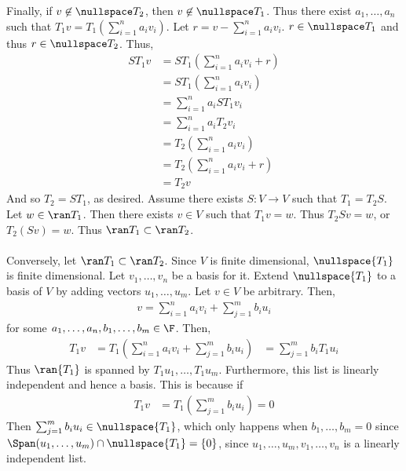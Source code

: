 \documentclass{book}
\begin{document}
\begin{enumerate}[label=\arabic*)]
      Finally, if $v \not\in \nullspace T_2$, then $v \not\in \nullspace T_1$. Thus there exist $a_1, \dots, a_n$ such that $T_1v = T_1(\sum_{i = 1}^{n}a_iv_i)$. Let $r = v -
      \sum_{i = 1}^{n}a_iv_i$. $r \in \nullspace T_1$ and thus $r \in \nullspace T_2$. Thus,
      \begin{align*}
        ST_1v & = ST_1(\sum_{i = 1}^{n}a_iv_i + r) \\
        & = ST_1(\sum_{i = 1}^{n}a_iv_i) \\
        & = \sum_{i = 1}^{n}a_iST_1v_i \\
        & = \sum_{i = 1}^{n}a_iT_2v_i \\
        & = T_2(\sum_{i = 1}^{n}a_iv_i) \\
        & = T_2(\sum_{i = 1}^{n}a_iv_i + r) \\
        & = T_2v
      \end{align*}
      And so $T_2 = ST_1$, as desired.
    \ii
      Assume there exists $S: V \to V$ such that $T_1 = T_2S$. Let $w \in \ran T_1$. Then there exists $v \in V$ such that $T_1v = w$. Thus $T_2Sv = w$, or $T_2(Sv) = w$. Thus $\ran T_1
      \subset \ran T_2$.  
      \\~\\

      Conversely, let $\ran T_1 \subset \ran T_2$. Since $V$ is finite dimensional, $\nullspace{T_1}$ is finite dimensional. Let $v_1, \dots, v_n$ be a basis for it. Extend
      $\nullspace{T_1}$ to a basis of $V$ by adding vectors $u_1, \dots, u_m$. Let $v \in V$ be arbitrary. Then,
      \begin{align*}
        v = \sum_{i = 1}^{n}a_iv_i + \sum_{j = 1}^{m}b_iu_i
      \end{align*}
      for some $a_1, \dots, a_n, b_1, \dots, b_m \in \F$. Then,
      \begin{align*}
        T_1v & = T_1(\sum_{i = 1}^{n}a_iv_i + \sum_{j = 1}^{m}b_iu_i)
        & = \sum_{j = 1}^{m}b_iT_1u_i
      \end{align*}
      Thus $\ran{T_1}$ is spanned by $T_1u_1, \dots, T_1u_m$. Furthermore, this list is linearly independent and hence a basis. This is because if 
      \begin{align*}
        T_1v & = T_1(\sum_{j = 1}^{m}b_iu_i) = 0
      \end{align*}
      Then $\sum_{j = 1}^{m}b_iu_i \in \nullspace{T_1}$, which only happens when $b_1, \dots, b_m = 0$ since $\Span(u_1, \dots, u_m) \cap \nullspace{T_1} = \{0\}$, since $u_1, \dots, u_m,
      v_1, \dots, v_n$ is a linearly independent list.


\end{enumerate}
\end{document}
